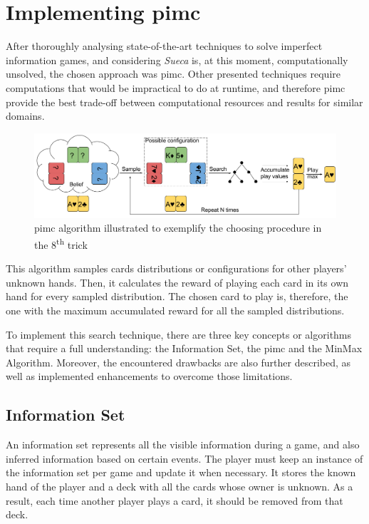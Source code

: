 \section{Implementing \ac{pimc}}
\label{sec:implementing}

After thoroughly analysing state-of-the-art techniques to solve imperfect information games, and considering \emph{Sueca} is, at this moment, computationally unsolved, the chosen approach was \ac{pimc}.
Other presented techniques require computations that would be impractical to do at runtime, and therefore \ac{pimc} provide the best trade-off between computational resources and results for similar domains.

\begin{figure}[h!]
  \centering
    \includegraphics[width=1\textwidth]{./img/4/PIMC}
  \caption{\ac{pimc} algorithm illustrated to exemplify the choosing procedure in the 8\textsuperscript{th} trick}
\label{fig:PIMC}
\end{figure}

This algorithm samples cards distributions or configurations for other players' unknown hands.
Then, it calculates the reward of playing each card in its own hand for every sampled distribution.
The chosen card to play is, therefore, the one with the maximum accumulated reward for all the sampled distributions.

To implement this search technique, there are three key concepts or algorithms that require a full understanding: the Information Set, the \ac{pimc} and the MinMax Algorithm.
Moreover, the encountered drawbacks are also further described, as well as implemented enhancements to overcome those limitations.


\subsection{Information Set}
An information set represents all the visible information during a game, and also inferred information based on certain events.
The player must keep an instance of the information set per game and update it when necessary.
It stores the known hand of the player and a deck with all the cards whose owner is unknown.
As a result, each time another player plays a card, it should be removed from that deck.

